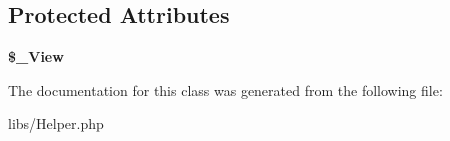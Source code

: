 \subsection*{Protected Attributes}
\begin{DoxyCompactItemize}
\item 
\hypertarget{classHelper_a700e3c0f47edc5c9f927e5b2b6a0fbf3}{
{\bfseries \$\_\-View}}
\label{classHelper_a700e3c0f47edc5c9f927e5b2b6a0fbf3}

\end{DoxyCompactItemize}


The documentation for this class was generated from the following file:\begin{DoxyCompactItemize}
\item 
libs/Helper.php\end{DoxyCompactItemize}
